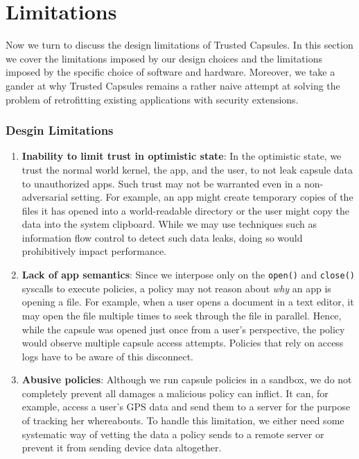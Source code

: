 \chapter{Limitations}
\label{sec:limitations}

Now we turn to discuss the design limitations of Trusted Capsules. In this
section we cover the limitations imposed by our design choices and the
limitations imposed by the specific choice of software and hardware. Moreover,
we take a gander at why Trusted Capsules remains a rather naive attempt at
solving the problem of retrofitting existing applications with security
extensions.

\subsection{Desgin Limitations}
\begin{enumerate}
    \item {\bf Inability to limit trust in optimistic state}: In the optimistic state, we
trust the normal world kernel, the app, and the user, to not leak capsule data
to unauthorized apps. Such trust may not be warranted even in a non-adversarial
setting. For example, an app might create temporary copies of the files it has
opened into a world-readable directory or the user might copy the data into the
system clipboard. While we may use techniques such as information flow control
to detect such data leaks, doing so would prohibitively impact performance.

    \item {\bf Lack of app semantics}: Since we interpose only on the {\tt open()} and
    {\tt close()} syscalls to execute policies, a policy may not reason about {\em
        why} an app is opening a file. For example, when a user opens a document in a
text editor, it may open the file multiple times to seek through the file in
parallel. Hence, while the capsule was opened just once from a user's
perspective, the policy would observe multiple capsule access attempts. Policies
that rely on access logs have to be aware of this disconnect.

    \item {\bf Abusive policies}: Although we run capsule policies in a sandbox, we do not
completely prevent all damages a malicious policy can inflict. It can, for
example, access a user's GPS data and send them to a server for the purpose of
tracking her whereabouts. To handle this limitation, we either need some
systematic way of vetting the data a policy sends to a remote server or prevent
it from sending device data altogether.
\end{enumerate}

